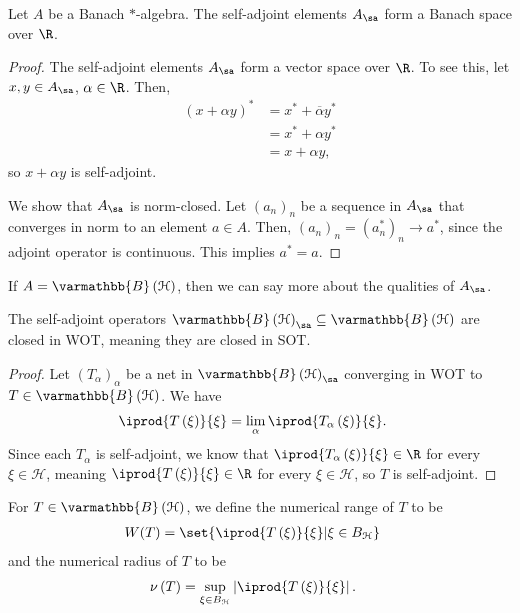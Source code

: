 \documentclass[10pt]{mypackage}
\renewcommand*{\mathbb}[1]{\varmathbb{#1}}
\newcommand{\B}{\mathbb{B}}
\begin{document}
\begin{proposition}
  Let $A$ be a Banach $\ast$-algebra. The self-adjoint elements $A_{\sa}$ form a Banach space over $\R$.
\end{proposition}
\begin{proof}
  The self-adjoint elements $A_{\sa}$ form a vector space over $\R$. To see this, let $x,y\in A_{\sa}$, $\alpha\in \R$. Then,
  \begin{align*}
    \left(x + \alpha y\right)^{\ast} &= x^{\ast} + \overline{\alpha}y^{\ast}\\
                                     &= x^{\ast} + \alpha y^{\ast}\\
                                     &= x + \alpha y,
  \end{align*}
  so $x + \alpha y$ is self-adjoint.\newline

  We show that $A_{\sa}$ is norm-closed. Let $\left(a_n\right)_n$ be a sequence in $A_{\sa}$ that converges in norm to an element $a\in A$. Then, $\left(a_n\right)_n = \left(a_n^{\ast}\right)_n\rightarrow a^{\ast}$, since the adjoint operator is continuous. This implies $a^{\ast} = a$.
\end{proof}
If $A = \B\left(\mathcal{H}\right)$, then we can say more about the qualities of $A_{\sa}$.
\begin{proposition}
  The self-adjoint operators $\B\left(\mathcal{H}\right)_{\sa}\subseteq \B\left(\mathcal{H}\right)$ are closed in WOT, meaning they are closed in SOT.
\end{proposition}
\begin{proof}
  Let $\left(T_{\alpha}\right)_{\alpha}$ be a net in $\B\left(\mathcal{H}\right)_{\sa}$ converging in WOT to $T\in \B\left(\mathcal{H}\right)$. We have
  \begin{align*}
    \iprod{T\left(\xi\right)}{\xi} &= \lim_{\alpha} \iprod{T_{\alpha}\left(\xi\right)}{\xi}.
  \end{align*}
  Since each $T_{\alpha}$ is self-adjoint, we know that $ \iprod{T_{\alpha}\left(\xi\right)}{\xi}\in \R$ for every $\xi\in \mathcal{H}$, meaning $ \iprod{T\left(\xi\right)}{\xi}\in \R $ for every $\xi\in \mathcal{H}$, so $T$ is self-adjoint.
\end{proof}
\begin{definition}
  For $T\in \B\left(\mathcal{H}\right)$, we define the numerical range of $T$ to be
  \begin{align*}
    W(T) &= \set{ \iprod{T\left(\xi\right)}{\xi} | \xi\in B_{\mathcal{H}} }
  \end{align*}
  and the numerical radius of $T$ to be
  \begin{align*}
    \nu\left(T\right) &= \sup_{\xi \in B_{\mathcal{H}}} \left\vert \iprod{T\left(\xi\right)}{\xi} \right\vert.
  \end{align*}
\end{definition}
\end{document}
